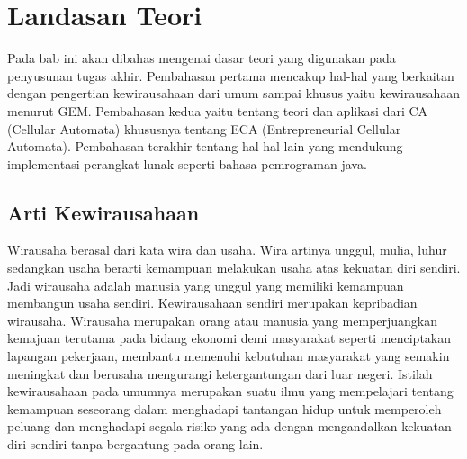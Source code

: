 \chapter{Landasan Teori}
\label{chap:teori}


 
Pada bab ini akan dibahas mengenai dasar teori yang digunakan pada penyusunan tugas akhir. Pembahasan pertama mencakup hal-hal yang berkaitan dengan pengertian kewirausahaan dari umum sampai khusus yaitu kewirausahaan menurut GEM. Pembahasan kedua yaitu tentang teori dan aplikasi dari CA (Cellular Automata) khususnya tentang ECA (Entrepreneurial Cellular Automata). Pembahasan terakhir tentang hal-hal lain yang mendukung implementasi perangkat lunak seperti bahasa pemrograman java.


\section{Arti Kewirausahaan}
\label{sec:artiwirausaha}

\graphicspath{{images/}}

Wirausaha berasal dari kata wira dan usaha. Wira artinya unggul, mulia, luhur sedangkan usaha berarti kemampuan melakukan usaha atas kekuatan diri sendiri. Jadi wirausaha adalah manusia yang unggul yang memiliki kemampuan membangun usaha sendiri. Kewirausahaan sendiri merupakan kepribadian wirausaha. Wirausaha merupakan orang atau manusia yang memperjuangkan kemajuan terutama pada bidang ekonomi demi masyarakat seperti menciptakan lapangan pekerjaan, membantu memenuhi kebutuhan masyarakat yang semakin meningkat dan berusaha mengurangi ketergantungan dari luar negeri. Istilah kewirausahaan pada umumnya merupakan suatu ilmu yang mempelajari tentang kemampuan seseorang dalam menghadapi tantangan hidup untuk memperoleh peluang dan menghadapi segala risiko yang ada dengan mengandalkan kekuatan diri sendiri tanpa bergantung pada orang lain. \cite{artiwirausaha} 




